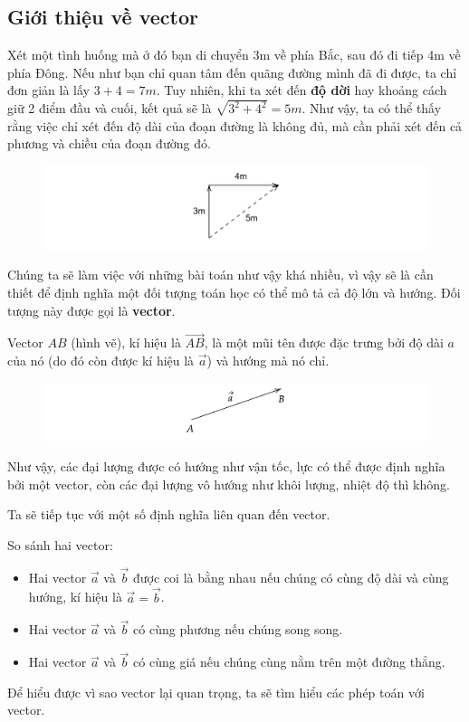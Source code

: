 \subsection{Giới thiệu về vector}
Xét một tình huống mà ở đó bạn di chuyển 3m về phía Bắc, sau đó đi tiếp 4m về phía Đông. Nếu như bạn chỉ quan tâm đến quãng đường mình đã đi được, ta chỉ đơn giản là lấy \(3+4=7\si{m}\). Tuy nhiên, khi ta xét đến \textbf{độ dời} hay khoảng cách giữ 2 điểm đầu và cuối, kết quả sẽ là \(\sqrt{3^2+4^2}=5\si{m}\). Như vậy, ta có thể thấy rằng việc chỉ xét đến độ dài của đoạn đường là không đủ, mà cần phải xét đến cả phương và chiều của đoạn đường đó.
\begin{figure}[H]
\centering
\includegraphics[width=1\textwidth]{Tuan2/Figures/gioithieuvector.png}
\end{figure}
Chúng ta sẽ làm việc với những bài toán như vậy khá nhiều, vì vậy sẽ là cần thiết để định nghĩa một đối tượng toán học có thể mô tả cả độ lớn và hướng. Đối tượng này được gọi là \textbf{vector}.
\begin{definition} Vector \(AB\) (hình vẽ), kí hiệu là \(\overrightarrow{AB}\), là một mũi tên được đặc trưng bởi độ dài \(a\) của nó (do đó còn được kí hiệu là \(\overrightarrow{a}\)) và hướng mà nó chỉ.
\end{definition}
\begin{figure}[H]
\centering
\includegraphics[width=1\textwidth]{Tuan2/Figures/vectorAB.png}
\end{figure}
Như vậy, các đại lượng được có hướng như vận tốc, lực có thể được định nghĩa bởi một vector, còn các đại lượng vô hướng như khôi lượng, nhiệt độ thì không.

Ta sẽ tiếp tục với một số định nghĩa liên quan đến vector.
\begin{definition}
    So sánh hai vector:
    \begin{itemize}
        \item Hai vector \(\overrightarrow{a}\) và \(\overrightarrow{b}\) được coi là bằng nhau nếu chúng có cùng độ dài và cùng hướng, kí hiệu là \(\overrightarrow{a}=\overrightarrow{b}\).
        \item Hai vector \(\overrightarrow{a}\) và \(\overrightarrow{b}\) có cùng phương nếu chúng song song.
        \item Hai vector \(\overrightarrow{a}\) và \(\overrightarrow{b}\) có cùng giá nếu chúng cùng nằm trên một đường thẳng.
    \end{itemize}
\end{definition}
Để hiểu được vì sao vector lại quan trọng, ta sẽ tìm hiểu các phép toán với vector.

